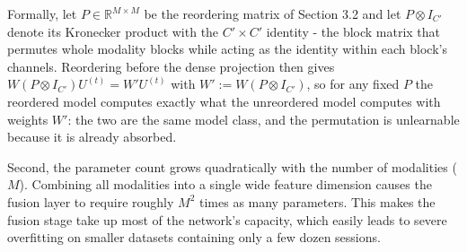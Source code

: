 \documentclass[11pt,a4paper]{article}
\newcommand{\R}{\mathbb{R}}
\begin{document}
	Formally, let $P \in \R^{M \times M}$ be the reordering matrix of Section 3.2 and let $P \otimes I_{C'}$ denote its Kronecker product with the $C' \times C'$ identity - the block matrix that permutes whole modality blocks while acting as the identity within each block's channels. Reordering before the dense projection then gives $W(P \otimes I_{C'})U^{(t)} = W'U^{(t)}$ with $W' := W(P \otimes I_{C'})$, so for any fixed $P$ the reordered model computes exactly what the unreordered model computes with weights $W'$: the two are the same model class, and the permutation is unlearnable because it is already absorbed.
	
	Second, the parameter count grows quadratically with the number of modalities ($M$). Combining all modalities into a single wide feature dimension causes the fusion layer to require roughly $M^2$ times as many parameters. This makes the fusion stage take up most of the network's capacity, which easily leads to severe overfitting on smaller datasets containing only a few dozen sessions.
\end{document}
